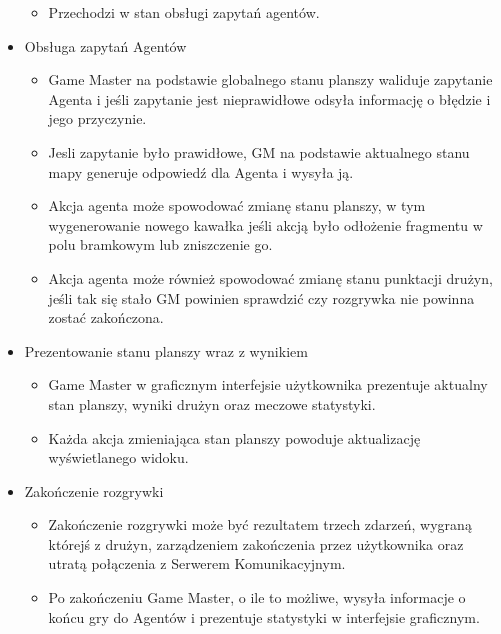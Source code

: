 \documentclass[../Dokumentacja.tex]{subfiles}
\begin{document}
\begin{itemize}
\begin{itemize}
		\item Przechodzi w stan obsługi zapytań agentów.
	\end{itemize}
	\item Obsługa zapytań Agentów
	\begin{itemize}
		\item Game Master na podstawie globalnego stanu planszy waliduje zapytanie Agenta i jeśli zapytanie jest nieprawidłowe odsyła informację o błędzie i jego przyczynie.
		\item Jesli zapytanie było prawidłowe, GM na podstawie aktualnego stanu mapy generuje odpowiedź dla Agenta i wysyła ją.
		\item Akcja agenta może spowodować zmianę stanu planszy, w tym wygenerowanie nowego kawałka jeśli akcją było odłożenie fragmentu w polu bramkowym lub zniszczenie go.
		\item Akcja agenta może również spowodować zmianę stanu punktacji drużyn, jeśli tak się stało GM powinien sprawdzić czy rozgrywka nie powinna zostać zakończona.
	\end{itemize}
	\item Prezentowanie stanu planszy wraz z wynikiem
	\begin{itemize}
		\item Game Master w graficznym interfejsie użytkownika prezentuje aktualny stan planszy, wyniki drużyn oraz meczowe statystyki.
		\item Każda akcja zmieniająca stan planszy powoduje aktualizację wyświetlanego widoku.
	\end{itemize}
	\item Zakończenie rozgrywki
	\begin{itemize}
		\item Zakończenie rozgrywki może być rezultatem trzech zdarzeń, wygraną którejś z drużyn, zarządzeniem zakończenia przez użytkownika oraz utratą połączenia z Serwerem Komunikacyjnym.
		\item Po zakończeniu Game Master, o ile to możliwe, wysyła informacje o końcu gry do Agentów i prezentuje statystyki w interfejsie graficznym.
	\end{itemize}
\end{itemize}
\end{document}
